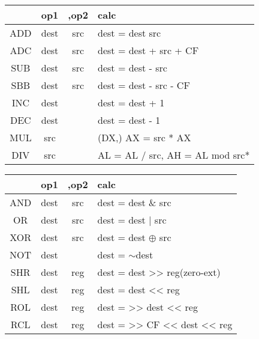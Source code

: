\begin{table*}
	\begin{minipage}{0.5\textwidth}
	\centering
	\caption{算术运算}
	\begin{tabular}{|>{\ttfamily}c|>{\ttfamily}c|>{\ttfamily}c|>{\ttfamily}l|}
		\hline
		& op1 & ,op2 & calc \\
		\hline
		ADD & dest & src & dest = dest src \\
		\hline
		ADC & dest & src & dest = dest + src + CF \\
		\hline
		SUB & dest & src & dest = dest - src \\
		\hline
		SBB & dest & src & dest = dest - src - CF \\
		\hline
		INC & dest &  & dest = dest + 1 \\
		\hline
		DEC & dest &  & dest = dest -  1 \\
		\hline
		MUL & src &  & (DX,) AX = src * AX \\
		\hline
		DIV & src &  & AL = AL / src, AH = AL mod src* \\
		\hline
	\end{tabular}
	\end{minipage}
	\begin{minipage}{0.5\textwidth}
		\centering
		\caption{逻辑运算}
		\begin{tabular}{|>{\ttfamily}c|>{\ttfamily}c|>{\ttfamily}c|>{\ttfamily}l|}
			\hline
			& op1 & ,op2 & calc \\
			\hline
			AND & dest & src & dest = dest \& src \\
			\hline
			OR & dest & src & dest = dest | src \\
			\hline
			XOR & dest & src & dest = dest $\oplus$ src \\
			\hline
			NOT & dest &  & dest = $\sim$dest \\
			\hline
			SHR & dest & reg & dest = dest >> reg(zero-ext) \\
			\hline
			SHL & dest & reg & dest = dest << reg \\
			\hline
			ROL & dest & reg & dest = >> dest << reg \\
			\hline
			RCL & dest & reg & dest = >> CF << dest << reg \\
			\hline
		\end{tabular}
	\end{minipage}
\end{table*}
